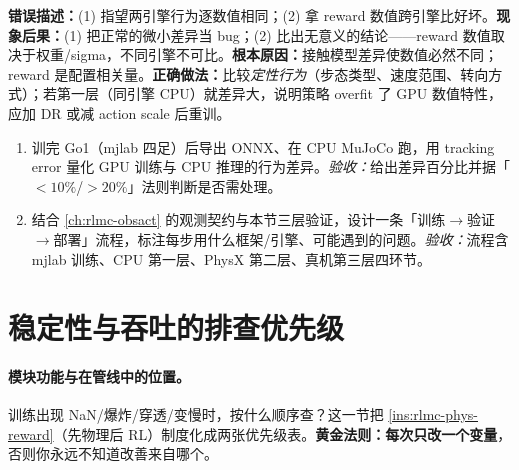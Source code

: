 
\begin{pitfall}
\textbf{错误描述：}(1) 指望两引擎行为逐数值相同；(2) 拿 reward 数值跨引擎比好坏。\textbf{现象后果：}(1) 把正常的微小差异当 bug；(2) 比出无意义的结论——reward 数值取决于权重/sigma，不同引擎不可比。\textbf{根本原因：}接触模型差异使数值必然不同；reward 是配置相关量。\textbf{正确做法：}比较\emph{定性行为}（步态类型、速度范围、转向方式）；若第一层（同引擎 CPU）就差异大，说明策略 overfit 了 GPU 数值特性，应加 DR 或减 action scale 后重训。
\end{pitfall}

\begin{practice}[本节练习]
\begin{enumerate}
  \item 训完 Go1（mjlab 四足）后导出 ONNX、在 CPU MuJoCo 跑，用 tracking error 量化 GPU 训练与 CPU 推理的行为差异。\emph{验收：}给出差异百分比并据「$<10\%$/$>20\%$」法则判断是否需处理。
  \item 结合 \cref{ch:rlmc-obsact} 的观测契约与本节三层验证，设计一条「训练$\to$验证$\to$部署」流程，标注每步用什么框架/引擎、可能遇到的问题。\emph{验收：}流程含 mjlab 训练、CPU 第一层、PhysX 第二层、真机第三层四环节。
\end{enumerate}
\end{practice}

\section{稳定性与吞吐的排查优先级}
\label{sec:rlmc-phys-stability}

\paragraph{模块功能与在管线中的位置。}训练出现 NaN/爆炸/穿透/变慢时，按什么顺序查？这一节把 \cref{ins:rlmc-phys-reward}（先物理后 RL）制度化成两张优先级表。\textbf{黄金法则：每次只改一个变量}，否则你永远不知道改善来自哪个。

